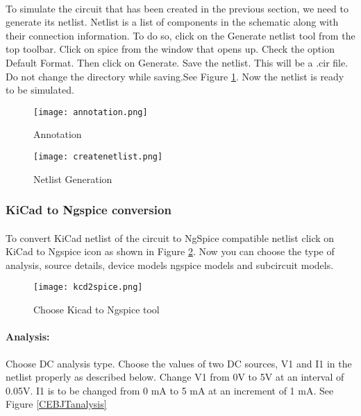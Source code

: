 \paragraph{}To simulate the circuit that has been created in the previous section, we need to generate
its netlist. Netlist is a list of components in the schematic along with their connection
information. To do so, click on the Generate netlist tool from the top toolbar. Click on
spice from the window that opens up. Check the option Default Format. Then click
on Generate. Save the netlist. This will be a .cir file. Do
not change the directory while saving.See Figure \ref{createnetlist10}.
 Now the netlist is ready to be simulated. 
\begin{figure}
\begin{minipage}{.5\textwidth}
  \centering
  \texttt{[image: annotation.png]}
  \caption{Annotation}
  \label{annotation10}
\end{minipage}%
\begin{minipage}{.5\textwidth}
  \centering
  \texttt{[image: createnetlist.png]}
  \caption{Netlist Generation}
  \label{createnetlist10}
\end{minipage}
\end{figure}

\subsubsection{KiCad to Ngspice conversion}

\paragraph{} To convert KiCad netlist of the circuit to NgSpice
compatible netlist click on KiCad to Ngspice icon as shown in Figure \ref{kcd2spice10}. Now you can choose the type of analysis, source details, device models ngspice models and subcircuit models.


\begin{figure}[h]
\centering
\texttt{[image: kcd2spice.png]}
\caption{Choose Kicad to Ngspice tool}
\label{kcd2spice10}
\end{figure}


\paragraph{Analysis:}Choose DC analysis type. Choose the values of two DC sources, V1 and I1 in the netlist properly as described below. Change V1 from 0V to 5V at an interval of 0.05V. I1 is to be changed from 0 mA to 5 mA at an increment of 1 mA. See Figure \ref{CEBJTanalysis}


